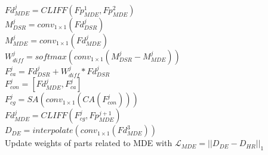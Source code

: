 \documentclass{bjtu-bachelor-thesis}
\begin{document}
\begin{adjustbox}{height=\the\paperheight-19cm,width=0.8\linewidth}
\begin{algorithm}[H]
{        
        {
        {
        $Fd_{MDE}^j=CLIFF(Fp_{MDE}^1,Fp_{MDE}^2)$\\
        }
        \Else
        {
        $M_{DSR}^j=conv_{1\times1}(Fd_{DSR}^j)$\\
        $M_{MDE}^j=conv_{1\times1}(Fd_{MDE}^j)$\\
        $W_{diff}^j=softmax(conv_{1\times1}(M_{DSR}^j-M_{MDE}^j))$\\
        $F_{ca}^j=Fd_{DSR}^j+W_{diff}^j\ast Fd_{DSR}^j$\\
        $F_{con}^j=[Fd_{MDE}^j,F_{ca}^j]$\\
        $F_{cg}^j=SA(conv_{1\times1}(CA(F_{con}^j)))$\\
        $Fd_{MDE}^j=CLIFF(F_{cg}^j,Fp_{MDE}^{j+1})$\\
        }
        }
        $D_{DE}=interpolate(conv_{1\times 1}(Fd_{MDE}^3))$\\
        Update weights of parts related to MDE with $\mathcal{L}_{MDE}=||D_{DE}-D_{HR}||_1$
        }
    \end{algorithm}
\end{adjustbox}

%

\newpage
\pagestyle{bjtufancy}

\nocite{*} %

\printbibliography[heading=bjtuheading]
\cleardoublepage


\end{document}
